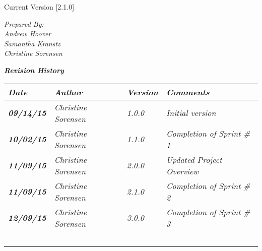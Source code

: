 


Current Version [2.1.0]
\vspace*{5mm}

{\color{MSBlue3}
\noindent
\textit{Prepared By:}\\
\textit{Andrew Hoover}\\
\textit{Samantha Kranstz}\\
\textit{Christine Sorensen}
}

\vfill
\noindent
{\color{color02} \textit{\textbf{Revision History}}}\\
\begin{tabular}{|>{\raggedright}p{1.5cm}|>{\raggedright}p{3cm}|>{\raggedright}p{1.5cm}|>{\raggedright}p{9cm}|}
\hline
\textit{\textbf{Date}} &  \textit{\textbf{Author}} & \textit{\textbf{Version}} & \textit{\textbf{Comments}}\tabularnewline
\hline
\textit{\textbf{09/14/15}} & \textit{Christine Sorensen} & \textit{1.0.0} & \textit{Initial version}\tabularnewline
\hline
\textit{\textbf{10/02/15}} & \textit{Christine Sorensen} & \textit{1.1.0} & \textit{Completion of Sprint \# 1}\tabularnewline
\hline
\textit{\textbf{11/09/15}} & \textit{Christine Sorensen} & \textit{2.0.0} & \textit{Updated Project Overview}\tabularnewline
\hline
\textit{\textbf{11/09/15}} & \textit{Christine Sorensen} & \textit{2.1.0} & \textit{Completion of Sprint \# 2}\tabularnewline
\hline
\textit{\textbf{12/09/15}} & \textit{Christine Sorensen} & \textit{3.0.0} & \textit{Completion of Sprint \# 3}\tabularnewline

\hline
 &  &  & \tabularnewline
 \hline
 &  &  & \tabularnewline
\hline
 &  &  & \tabularnewline
\hline
 &  &  & \tabularnewline
\hline
 &  &  & \tabularnewline
\hline
\end{tabular}
\vfill


